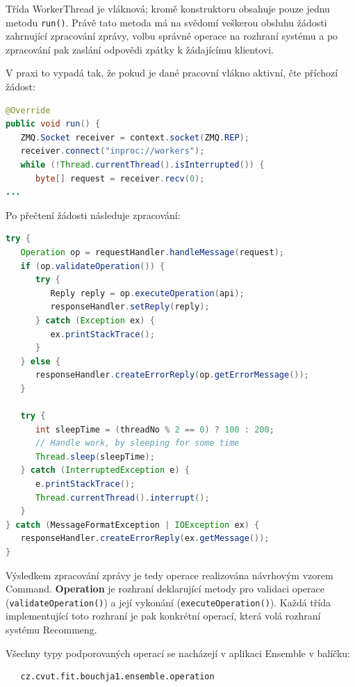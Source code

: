 \documentclass[thesis=M,czech]{FITthesis}[2014/05/07]
\begin{document}
Třída WorkerThread je vláknová; kromě konstruktoru obsahuje pouze jednu metodu \texttt{run()}. Právě tato metoda má na svědomí veškerou obsluhu žádosti zahrnující zpracování zprávy, volbu správné operace na rozhraní systému a po zpracování pak zaslání odpovědi zpátky k žádajícímu klientovi.

V praxi to vypadá tak, že pokud je dané pracovní vlákno aktivní, čte příchozí žádost:

\begin{lstlisting}[language=java]
@Override
public void run() {
   ZMQ.Socket receiver = context.socket(ZMQ.REP);
   receiver.connect("inproc://workers");
   while (!Thread.currentThread().isInterrupted()) {
      byte[] request = receiver.recv(0);
...
\end{lstlisting}

Po přečtení žádosti následuje zpracování:

\begin{lstlisting}[language=java]
try {
   Operation op = requestHandler.handleMessage(request);
   if (op.validateOperation()) {
      try {
         Reply reply = op.executeOperation(api);
         responseHandler.setReply(reply);
      } catch (Exception ex) {
         ex.printStackTrace();
      }
   } else {
      responseHandler.createErrorReply(op.getErrorMessage());
   }

   try {
      int sleepTime = (threadNo % 2 == 0) ? 100 : 200;
      // Handle work, by sleeping for some time
      Thread.sleep(sleepTime);
   } catch (InterruptedException e) {
      e.printStackTrace();
      Thread.currentThread().interrupt();
   }
} catch (MessageFormatException | IOException ex) {
   responseHandler.createErrorReply(ex.getMessage());
}
\end{lstlisting}

Výsledkem zpracování zprávy je tedy operace realizována návrhovým vzorem Command. \textbf{Operation} je rozhraní deklarující metody pro validaci operace (\texttt{validateOperation()}) a její vykonání (\texttt{executeOperation()}). Každá třída implementující toto rozhraní je pak konkrétní operací, která volá rozhraní systému Recommeng. 

Všechny typy podporovaných operací se nacházejí v aplikaci Ensemble v balíčku:

\begin{verbatim}
   cz.cvut.fit.bouchja1.ensemble.operation
\end{verbatim}
\end{document}
